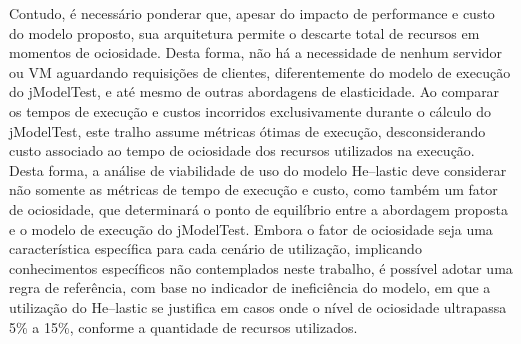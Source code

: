 \documentclass[english,brazilian]{UNISINOSmonografia} %
\begin{document}

Contudo, é necessário ponderar que, apesar do impacto de performance e custo do modelo proposto, sua arquitetura permite o descarte total de recursos em momentos de ociosidade.
%
Desta forma, não há a necessidade de nenhum servidor ou VM aguardando requisições de clientes, diferentemente do modelo de execução do jModelTest, e até mesmo de outras abordagens de elasticidade.
%
Ao comparar os tempos de execução e custos incorridos exclusivamente durante o cálculo do jModelTest, este tralho assume métricas ótimas de execução, desconsiderando custo associado ao tempo de ociosidade dos recursos utilizados na execução.
%
Desta forma, a análise de viabilidade de uso do modelo \textsf{He}--lastic deve considerar não somente as métricas de tempo de execução e custo, como também um fator de ociosidade, que determinará o ponto de equilíbrio entre a abordagem proposta e o modelo de execução do jModelTest.
%
Embora o fator de ociosidade seja uma característica específica para cada cenário de utilização, implicando conhecimentos específicos não contemplados neste trabalho, é possível adotar uma regra de referência, com base no indicador de ineficiência do modelo, em que a utilização do \textsf{He}--lastic se justifica em casos onde o nível de ociosidade ultrapassa 5\% a 15\%, conforme a quantidade de recursos utilizados.










\end{document}
